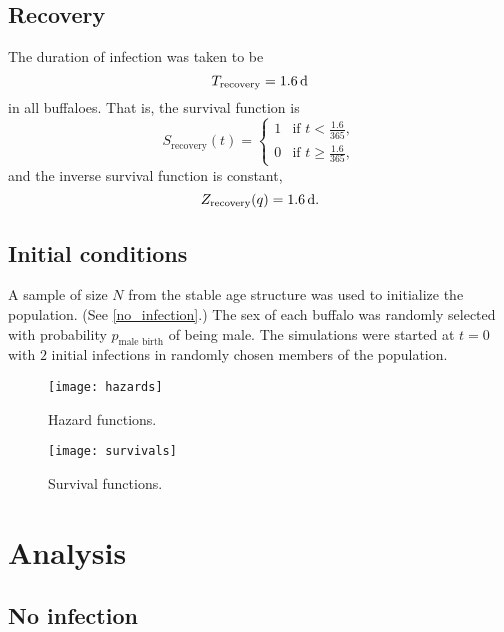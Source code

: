 \documentclass{jpmarticle}
\begin{document}
\subsection{Recovery}

The duration of infection was taken to be
\begin{equation}
  T_{\text{recovery}} = \unit[1.6]{d}
\end{equation}
in all buffaloes.  That is, the survival function is
\begin{equation}
  S_{\text{recovery}}(t) =
  \begin{cases}
    1 & \text{if $t < \frac{1.6}{365}$},
    \\
    0 & \text{if $t \geq \frac{1.6}{365}$},
  \end{cases}
\end{equation}
and the inverse survival function is constant,
\begin{equation}
  Z_{\text{recovery}}(q) = \unit[1.6]{d}.
\end{equation}


\subsection{Initial conditions}

A sample of size $N$ from the stable age structure was used to
initialize the population.  (See \autoref{no_infection}.)  The sex of
each buffalo was randomly selected with probability
$p_{\text{male birth}}$ of being male.  The simulations were started
at $t = 0$ with $2$ initial infections in randomly chosen members of
the population.


\begin{figure}
  \centering
  \texttt{[image: hazards]}
  \caption{Hazard functions.}
  \label{fig:hazard}
\end{figure}


\begin{figure}
  \centering
  \texttt{[image: survivals]}
  \caption{Survival functions.}
  \label{fig:survival}
\end{figure}



\clearpage
\section{Analysis}

\subsection{No infection}
\label{no_infection}
\end{document}
